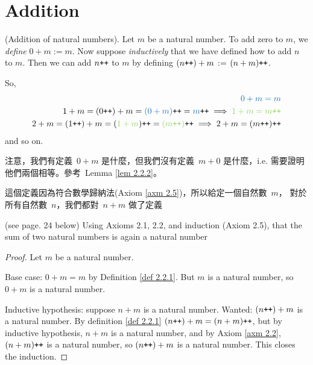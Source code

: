 \section{Addition}\label{sec 2.2}

\newcommand{\BLUE}[1]{\textcolor{RoyalBlue}{#1}}
\newcommand{\GREEN}[1]{\textcolor{YellowGreen}{#1}}

\begin{definition} \label{def 2.2.1} (Addition of natural numbers). Let \(m\) be a natural number. To add zero to \(m\), we \emph{define} \(0 + m := m\). Now suppose \emph{inductively} that we have defined how to add \(n\) to \(m\). Then we can add \(n\texttt{++} \) to \(m\) by defining \((n\texttt{++}) + m\) := \((n + m)\texttt{++}\).
\end{definition}
\begin{note}
So,
\begin{align*}
\BLUE{0 + m = m}\\
1 + m = (0\INC) + m = \BLUE{(0 + m)}\INC = \BLUE{m}\INC \implies \GREEN{1 + m = m\INC} \\
2 + m = (1\INC) + m = (\GREEN{1 + m})\INC = \GREEN{(m\INC)}\INC \implies 2 + m = (m\INC)\INC
\end{align*}
and so on.
\end{note}
\begin{note}
注意，我們有定義\ \(0 + m\) 是什麼，但我們沒有定義\ \(m + 0\) 是什麼，i.e. 需要證明他們兩個相等。參考\ Lemma \ref{lem 2.2.2}。
\end{note}
\begin{note}
這個定義因為符合數學歸納法(Axiom \ref{axm 2.5})，所以給定一個自然數\ \(m\)， 對於所有自然數\ \(n\)，我們都對\ \(n + m\) 做了定義
\end{note}

\begin{additional corollary}\label{ac 2.2.1} (see page. 24 below) Using Axioms 2.1, 2.2, and induction (Axiom 2.5), that the sum of two natural numbers is again a natural number 
\begin{proof}
Let \(m\) be a natural number.

Base case: \(0 + m = m\) by Definition \ref{def 2.2.1}. But \(m\) is a natural number, so \(0 + m\) is a natural number. 

Inductive hypothesis: suppose \(n + m\) is a natural number. Wanted: \((n\texttt{++}) + m\) is a natural number. By definition \ref{def 2.2.1} \BLUE{\((n\texttt{++}) + m = (n + m)\texttt{++}\)}, but by inductive hypothesis, \(n + m\) is a natural number, and by Axiom \ref{axm 2.2}, \BLUE{\((n + m)\texttt{++}\)} is a natural number, so \BLUE{\((n\texttt{++}) + m\)} is a natural number. This closes the induction.
\end{proof}
\end{additional corollary}

